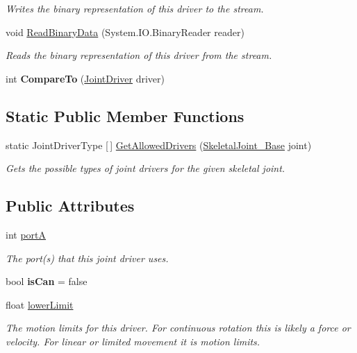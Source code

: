 \begin{DoxyCompactItemize}
\begin{DoxyCompactList}\small\item\em Writes the binary representation of this driver to the stream. \end{DoxyCompactList}\item 
void \hyperlink{class_joint_driver_a1db6f1668ea9122fb0e5d3f0aaa3f621}{Read\+Binary\+Data} (System.\+I\+O.\+Binary\+Reader reader)
\begin{DoxyCompactList}\small\item\em Reads the binary representation of this driver from the stream. \end{DoxyCompactList}\item 
\mbox{\label{class_joint_driver_a81fbb4302489ef44481d0adc4f10ca16}} 
int {\bfseries Compare\+To} (\hyperlink{class_joint_driver}{Joint\+Driver} driver)
\end{DoxyCompactItemize}
\subsection*{Static Public Member Functions}
\begin{DoxyCompactItemize}
\item 
static Joint\+Driver\+Type \mbox{[}$\,$\mbox{]} \hyperlink{class_joint_driver_adea8023e289a40e4d232cbac87e6a6e3}{Get\+Allowed\+Drivers} (\hyperlink{class_skeletal_joint___base}{Skeletal\+Joint\+\_\+\+Base} joint)
\begin{DoxyCompactList}\small\item\em Gets the possible types of joint drivers for the given skeletal joint. \end{DoxyCompactList}\end{DoxyCompactItemize}
\subsection*{Public Attributes}
\begin{DoxyCompactItemize}
\item 
int \hyperlink{class_joint_driver_a8bd27164aad80347972763dd56c5b311}{portA}
\begin{DoxyCompactList}\small\item\em The port(s) that this joint driver uses. \end{DoxyCompactList}\item 
\mbox{\label{class_joint_driver_a3a59a404a28d1d28c5f46379eadb1be2}} 
bool {\bfseries is\+Can} = false
\item 
float \hyperlink{class_joint_driver_a251b0eb937cd1007497acf4cfb594fe0}{lower\+Limit}
\begin{DoxyCompactList}\small\item\em The motion limits for this driver. For continuous rotation this is likely a force or velocity. For linear or limited movement it is motion limits. \end{DoxyCompactList}\end{DoxyCompactItemize}
